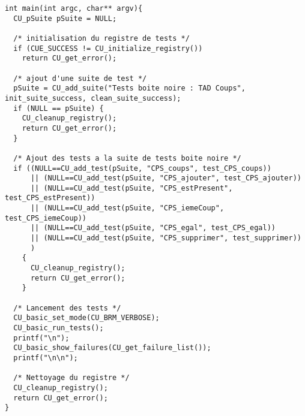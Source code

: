 \begin{lstlisting}
int main(int argc, char** argv){
  CU_pSuite pSuite = NULL;

  /* initialisation du registre de tests */
  if (CUE_SUCCESS != CU_initialize_registry())
    return CU_get_error();

  /* ajout d'une suite de test */
  pSuite = CU_add_suite("Tests boite noire : TAD Coups", init_suite_success, clean_suite_success);
  if (NULL == pSuite) {
    CU_cleanup_registry();
    return CU_get_error();
  }

  /* Ajout des tests a la suite de tests boite noire */
  if ((NULL==CU_add_test(pSuite, "CPS_coups", test_CPS_coups))
      || (NULL==CU_add_test(pSuite, "CPS_ajouter", test_CPS_ajouter))
      || (NULL==CU_add_test(pSuite, "CPS_estPresent", test_CPS_estPresent))
      || (NULL==CU_add_test(pSuite, "CPS_iemeCoup", test_CPS_iemeCoup))
      || (NULL==CU_add_test(pSuite, "CPS_egal", test_CPS_egal))
      || (NULL==CU_add_test(pSuite, "CPS_supprimer", test_supprimer))
      )
    {
      CU_cleanup_registry();
      return CU_get_error();
    }

  /* Lancement des tests */
  CU_basic_set_mode(CU_BRM_VERBOSE);
  CU_basic_run_tests();
  printf("\n");
  CU_basic_show_failures(CU_get_failure_list());
  printf("\n\n");

  /* Nettoyage du registre */
  CU_cleanup_registry();
  return CU_get_error();
}
\end{lstlisting}

